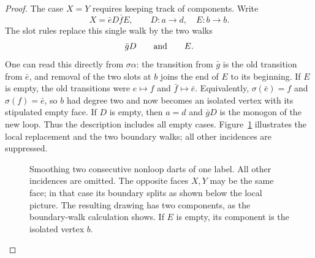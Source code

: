 \begin{proof}
The case $X=Y$ requires keeping track of components.  Write
\[
 X=\bar eD\bar fE,
 \qquad D:a\to d,\quad E:b\to b.
\]
The slot rules replace this single walk by the two walks
\begin{equation}\label{eq:gluing-smooth-split}
 \bar gD\qquad\hbox{and}\qquad E.
\end{equation}
One can read this directly from $\sigma\alpha$: the transition from
$\bar g$ is the old transition from $\bar e$, and removal of the two
slots at $b$ joins the end of $E$ to its beginning.  If $E$ is empty,
the old transitions were $e\mapsto f$ and $\bar f\mapsto\bar e$.
Equivalently, $\sigma(\bar e)=f$ and $\sigma(f)=\bar e$, so $b$
had degree two and now becomes an isolated vertex with its stipulated
empty face.  If $D$ is empty, then $a=d$ and $\bar gD$ is the monogon
of the new loop.  Thus the description includes all empty cases.
Figure~\ref{fig:gluing-smoothing} illustrates the local replacement and
the two boundary walks; all other incidences are suppressed.

\begin{figure}[ht]
\centering
{}
\caption{Smoothing two consecutive nonloop darts of one label.
All other incidences are omitted.  The opposite faces $X,Y$ may be
the same face; in that case its boundary splits as shown below the local
picture. The resulting drawing has two components, as the boundary-walk
calculation shows. If $E$ is empty, its component is the isolated vertex $b$.}
\label{fig:gluing-smoothing}
\end{figure}


\end{proof}

